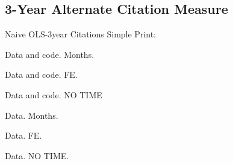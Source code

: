 \documentclass{beamer}
\begin{document}
\begin{frame}{}
\scalebox{0.3}{}
\end{frame}

\begin{frame}{}
\scalebox{0.3}{}
\end{frame}

\begin{frame}{}
\scalebox{0.3}{}
\end{frame}

\begin{frame}{}
\scalebox{0.3}{}
\end{frame}

\subsection{3-Year Alternate Citation Measure}
\begin{frame}{Naive OLS-3year Citations}
Simple Print:

Data and code. Months.

Data and code. FE.

Data and code. NO TIME

Data. Months.

Data. FE.

Data. NO TIME.

\end{frame}

\begin{frame}{}
\scalebox{0.3}{}
\end{frame}

\begin{frame}{}
\scalebox{0.3}{}
\end{frame}


\begin{frame}{}
\scalebox{0.3}{}
\end{frame}

\begin{frame}{}
\scalebox{0.3}{}
\end{frame}

\begin{frame}{}
\scalebox{0.3}{}
\end{frame}
\end{document}
